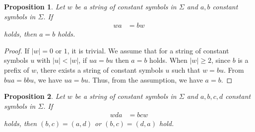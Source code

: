 \newtheorem{prop}{Proposition}
\newcommand{\pair}[2]{(#1,#2)}
\newcommand{\TheConditionA}{$b \not\in \{a,d\}$ and $c \not\in \{a,d\}$}
\newcommand{\TheConditionB}{$b \not= d \mbox{~and~}c \not\in \{a,d\}$}
\newcommand{\TheConditionBsub}{$c \not\in \{a,d\}$}
\newcommand{\TheConditionC}{$b \not\in \{a, d\} \mbox{~and~} c \not= a$}

\begin{prop}\label{prop:repstring_origin}
  Let $w$ be a string of constant symbols in $\Sigma$ and $a,b$ constant symbols in $\Sigma$.
  If
  \begin{align}
  wa & = bw\label{eq:repstring_origin}
  \end{align}
  holds, then $a = b$ holds.
\end{prop}

\begin{proof}
If $|w|=0$ or $1$, it is trivial. We assume that for a string of constant symbols $u$ with $|u| < |w|$, if $ua = bu$ then $a = b$ holds. When $|w| \geq 2$, since $b$ is a prefix of $w$, there exists a string of constant symbols $u$ such that $w = bu$. From $bua = bbu$, we have $ua = bu$. Thus, from the assumption, we have $a = b$.  
\end{proof}

\begin{prop}\label{prop:repstring_base}
Let $w$ be a string of constant symbols in $\Sigma$ and $a,b,c,d$ constant symbols in $\Sigma$.
If
\begin{align}
wda & = bcw\label{eq:repstring_base}
\end{align}
holds, then $\pair{b}{c} = \pair{a}{d}$ or $\pair{b}{c} = \pair{d}{a}$ hold.
\end{prop}

